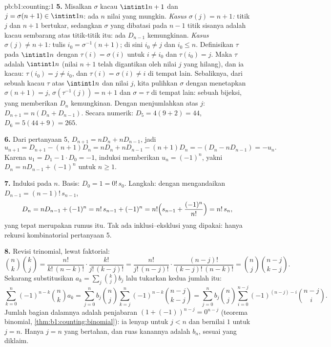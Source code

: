 \begin{solution}{pb:b1:counting:1}
\textbf{5.} Misalkan $\sigma$  kacau $\intint1{n+1}$ dan
$j = \sigma(n+1) \in \intint1n$: ada $n$ nilai yang mungkin. \emph{Kasus
$\sigma(j) = n+1$:} titik $j$ dan $n+1$ bertukar, sedangkan $\sigma$
yang dibatasi pada $n - 1$ titik sisanya adalah  kacau
sembarang atas titik-titik itu: ada $D_{n-1}$ kemungkinan. \emph{Kasus $\sigma(j)
\neq n+1$:} tulis $i_0 = \sigma^{-1}(n+1)$; di sini $i_0 \neq j$ dan
$i_0 \leq n$. Definisikan $\tau$ pada $\intint1n$ dengan $\tau(i) = \sigma(i)$
untuk $i \neq i_0$ dan $\tau(i_0) = j$. Maka $\tau$ adalah 
$\intint1n$ (nilai $n+1$ telah digantikan oleh nilai
$j$ yang hilang), dan ia  kacau: $\tau(i_0) = j \neq i_0$, dan
$\tau(i) = \sigma(i) \neq i$ di tempat lain. Sebaliknya, dari sebuah
 kacau $\tau$ atas $\intint1n$ dan nilai $j$, kita pulihkan
$\sigma$ dengan menetapkan $\sigma(n+1) = j$, $\sigma(\tau^{-1}(j)) = n+1$
dan $\sigma = \tau$ di tempat lain: sebuah bijeksi, yang memberikan $D_n$
kemungkinan. Dengan menjumlahkan atas $j$: $D_{n+1} = n(D_n + D_{n-1})$.
Secara numerik: $D_5 = 4(9 + 2) = 44$, $D_6 = 5(44 + 9) = 265$.

\textbf{6.} Dari pertanyaan 5, $D_{n+1} = nD_n + nD_{n-1}$, jadi
\[
u_{n+1} = D_{n+1} - (n+1)D_n = nD_n + nD_{n-1} - (n+1)D_n
= -(D_n - nD_{n-1}) = -u_n .
\]
Karena $u_1 = D_1 - 1 \cdot D_0 = -1$, induksi memberikan $u_n =
(-1)^n$, yakni $D_n = nD_{n-1} + (-1)^n$ untuk $n \geq 1$.

\textbf{7.} Induksi pada $n$. Basis: $D_0 = 1 = 0!\,s_0$. Langkah:
dengan mengandaikan $D_{n-1} = (n-1)!\,s_{n-1}$,
\[
D_n = nD_{n-1} + (-1)^n = n!\,s_{n-1} + (-1)^n
= n!\Bigl(s_{n-1} + \frac{(-1)^n}{n!}\Bigr) = n!\,s_n ,
\]
yang tepat merupakan rumus itu. Tak ada inklusi--eksklusi yang dipakai: hanya
rekursi kombinatorial pertanyaan 5.

\textbf{8.} Revisi trinomial, lewat faktorial:
\[
\binom nk \binom kj
= \frac{n!}{k!\,(n-k)!} \cdot \frac{k!}{j!\,(k-j)!}
= \frac{n!}{j!\,(n-j)!} \cdot \frac{(n-j)!}{(k-j)!\,(n-k)!}
= \binom nj \binom{n-j}{k-j} .
\]
Sekarang substitusikan $a_k = \sum_j \binom kj b_j$ lalu tukarkan kedua
jumlah  itu:
\[
\sum_{k=0}^{n} (-1)^{n-k} \binom nk a_k
= \sum_{j=0}^{n} b_j \binom nj
\sum_{k=j}^{n} (-1)^{n-k} \binom{n-j}{k-j}
= \sum_{j=0}^{n} b_j \binom nj
\sum_{i=0}^{n-j} (-1)^{(n-j)-i} \binom{n-j}{i} .
\]
Jumlah bagian dalamnya adalah penjabaran $(1 + (-1))^{n-j} = 0^{n-j}$
(teorema binomial, \cref{thm:b1:counting:binomial}): ia lenyap
untuk $j < n$ dan bernilai $1$ untuk $j = n$. Hanya $j = n$ yang bertahan, dan
ruas kanannya adalah $b_n$, sesuai yang diklaim.


\end{solution}
